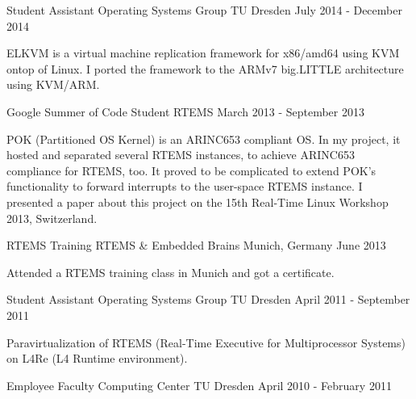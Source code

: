 \begin{cventries}
  \cventry
    {Student Assistant}
    {Operating Systems Group}
    {TU Dresden}
    {July 2014 - December 2014}
    {
      \begin{cvitems}
      \item {ELKVM is a virtual machine replication framework for x86/amd64 using KVM
      ontop of Linux. I ported the framework to the ARMv7 big.LITTLE
      architecture using KVM/ARM.}
      \end{cvitems}
    }
  \cventry
    {Google Summer of Code Student}
    {RTEMS}
    {}
    {March 2013 - September 2013}
    {
      \begin{cvitems}
      \item {POK (Partitioned OS Kernel) is an ARINC653 compliant OS. In my
	  project, it hosted and separated several RTEMS instances, to achieve
      ARINC653 compliance for RTEMS, too. It proved to be complicated to extend
      POK's functionality to forward interrupts to the user-space RTEMS
      instance. I presented a paper about this project on the 15th Real-Time Linux
    Workshop 2013, Switzerland.}
      \end{cvitems}
    }
  \cventry
    {RTEMS Training}
    {RTEMS \& Embedded Brains}
    {Munich, Germany}
    {June 2013}
    {
      \begin{cvitems}
      \item {Attended a RTEMS training class in Munich and got a
	certificate.}
      \end{cvitems}
    }
  \cventry
    {Student Assistant}
    {Operating Systems Group}
    {TU Dresden}
    {April 2011 - September 2011}
    {
      \begin{cvitems}
      \item {Paravirtualization of RTEMS (Real-Time Executive for
	Multiprocessor Systems) on L4Re (L4 Runtime environment).}
      \end{cvitems}
    }
  \cventry
    {Employee}
    {Faculty Computing Center}
    {TU Dresden}
    {April 2010 - February 2011}
    {}
\end{cventries}
